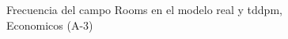 \begin{figure}[H]
    \centering
    
    \caption{Frecuencia del campo Rooms en el modelo real y tddpm, Economicos (A-3)}
    \label{frecuency-Rooms-tddpm_mlp}
\end{figure}